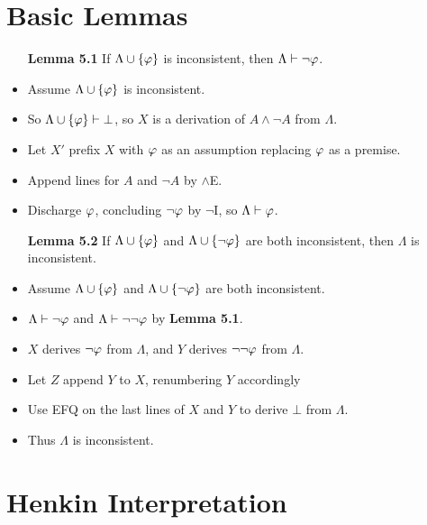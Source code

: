 \documentclass[a4paper, 11pt]{article} %
\begin{document}
\section*{Basic Lemmas}

\begin{itemize}
  \item[\bf Lemma 5.1] If $\Lambda\cup\lbrace\varphi\rbrace$ is inconsistent, then $\Lambda\vdash\neg\varphi$.
    \item Assume $\Lambda\cup\lbrace\varphi\rbrace$ is inconsistent.
    \item So $\Lambda\cup\lbrace\varphi\rbrace \vdash \bot$, so $X$ is a derivation of $A \wedge \neg A$ from $\Lambda$.
    \item Let $X'$ prefix $X$ with $\varphi$ as an assumption replacing $\varphi$ as a premise.
    \item Append lines for $A$ and $\neg A$ by $\wedge$E. 
    \item Discharge $\varphi$, concluding $\neg \varphi$ by $\neg$I, so $\Lambda \vdash \varphi$. 
  \item[\bf Lemma 5.2] If $\Lambda \cup \lbrace\varphi\rbrace$ and $\Lambda\cup \lbrace\neg\varphi\rbrace$ are both inconsistent, then $\Lambda$ is inconsistent.
    \item Assume $\Lambda \cup \lbrace\varphi\rbrace$ and $\Lambda\cup \lbrace\neg\varphi\rbrace$ are both inconsistent.
    \item $\Lambda\vdash \neg\varphi$ and $\Lambda\vdash\neg\neg\varphi$ by \textbf{Lemma 5.1}.
    \item $X$ derives $\neg\varphi$ from $\Lambda$, and $Y$ derives $\neg\neg\varphi$ from $\Lambda$. 
    \item Let $Z$ append $Y$ to $X$, renumbering $Y$ accordingly
    \item Use EFQ on the last lines of $X$ and $Y$ to derive $\bot$ from $\Lambda$. 
    \item Thus $\Lambda$ is inconsistent. 
\end{itemize}





\section*{Henkin Interpretation}
\end{document}

